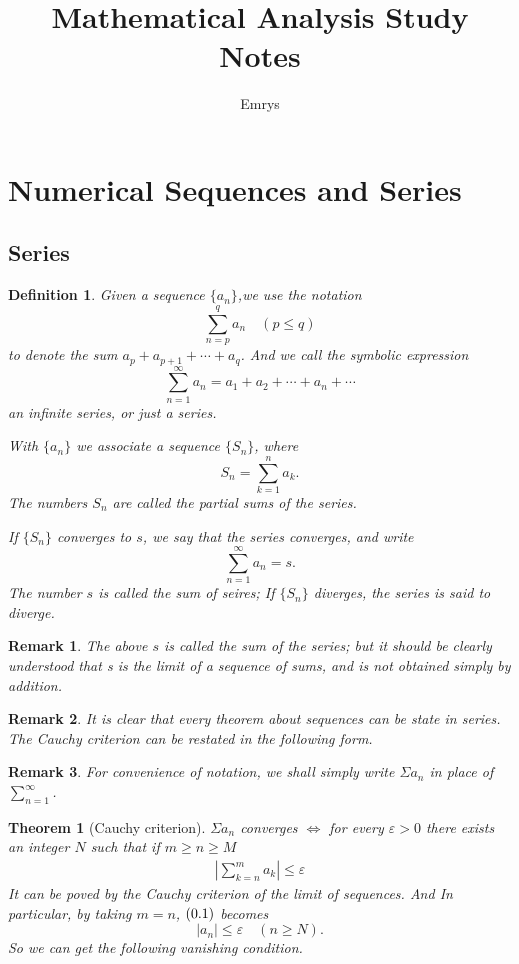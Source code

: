 \documentclass[12pt]{article}
\title{Mathematical Analysis Study Notes}
\author{Emrys}
\date{}
\theoremstyle{oneline}
\newtheorem{theorem}{Theorem}[subsection]
\newtheorem{remark}{Remark}[subsection]
\newtheorem{definition}{Definition}[subsection]
\theoremstyle{twoline}
\begin{document}
 
\maketitle
\tableofcontents
\newpage

\section{Numerical Sequences and Series}

\subsection{Series}
\begin{definition}
  Given a sequence $\{a_n\}$,we use the notation
   \[\sum\limits_{n=p}^{q}a_n\quad (p\leq q)\]
  to denote the sum $a_p+a_{p+1}+\cdots+a_q$. And we call the symbolic expression
  \[\sum\limits_{n=1}^{\infty}a_n=a_1+a_2+\cdots+a_n+\cdots\]
  an infinite series, or just a series.

  With $\{a_n\}$ we associate a sequence $\{S_n\}$, where
  \[S_n=\sum\limits_{k=1}^n a_k.\]
  The numbers $S_n$ are called the partial sums of the series.

  If $\{S_n\}$ converges to $s$, we say that the series converges, and write
  \[\sum\limits_{n=1}^{\infty}a_n=s.\]
  The number $s$ is called the sum of seires; If $\{S_n\}$ diverges, the series is said to diverge.
\end{definition}

\begin{remark}
  The above $s$ is called the sum of the series; but it should be clearly understood that s is the limit of a sequence of sums, and is not obtained simply by addition.
\end{remark}

\begin{remark}
  It is clear that every theorem about sequences can be state in series. The Cauchy criterion can be restated in the following form. 
\end{remark}

\begin{remark}
  For convenience of notation, we shall simply write $\Sigma a_n$ in place of $\sum\limits_{n=1}^{\infty}$.
\end{remark}

\begin{theorem}[Cauchy criterion]
  $\Sigma a_n$ converges $\iff$ for every $\varepsilon>0$ there exists an integer $N$ such that if $m\geq n\geq M$
  \begin{align}
    |\sum\limits_{k=n}^m a_k|\leq \varepsilon
  \end{align}
  It can be poved by the Cauchy criterion of the limit of sequences.
  And In particular, by taking $m=n$, $(\thesection.1)$ becomes
  \[|a_n|\leq\varepsilon\quad(n\geq N).\]
  So we can get the following vanishing condition.
\end{theorem}
\end{document}

